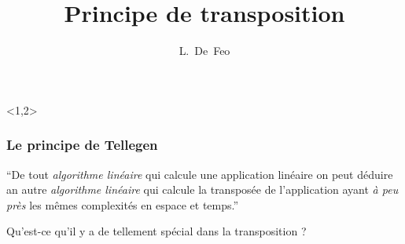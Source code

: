 \documentclass[10pt,draft]{beamer}
\title[Principe de transposition]{Principe de transposition
  \only<1>{et tours d'Artin-Schreier}}
\author{L.~De~Feo}
\institute[]{LIX, École Polytechnique}
\begin{document}
\begin{frame}<1,2>
  \titlepage
\end{frame}


\begin{frame}
  \frametitle{Le principe de Tellegen}

  \Large
  \begin{center}
    ``De tout \emph{algorithme linéaire} qui calcule une application
    linéaire on peut déduire an autre \emph{algorithme linéaire} qui
    calcule la transposée de l'application ayant \emph{à peu près} les
    mêmes complexités en espace et temps.''
  \end{center}

  \vfill
  \pause

  \begin{center}
    Qu'est-ce qu'il y a de tellement spécial dans la transposition ?
  \end{center}
\end{frame}
\end{document}

